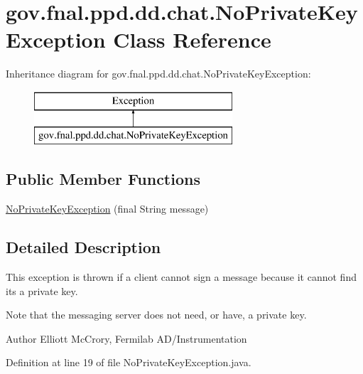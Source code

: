 \hypertarget{classgov_1_1fnal_1_1ppd_1_1dd_1_1chat_1_1NoPrivateKeyException}{\section{gov.\-fnal.\-ppd.\-dd.\-chat.\-No\-Private\-Key\-Exception Class Reference}
\label{classgov_1_1fnal_1_1ppd_1_1dd_1_1chat_1_1NoPrivateKeyException}
}
Inheritance diagram for gov.\-fnal.\-ppd.\-dd.\-chat.\-No\-Private\-Key\-Exception\-:\begin{figure}[H]
\begin{center}
\leavevmode
\includegraphics[height=2.000000cm]{classgov_1_1fnal_1_1ppd_1_1dd_1_1chat_1_1NoPrivateKeyException}
\end{center}
\end{figure}
\subsection*{Public Member Functions}
\begin{DoxyCompactItemize}
\item 
\hyperlink{classgov_1_1fnal_1_1ppd_1_1dd_1_1chat_1_1NoPrivateKeyException_a3ffa7c8308049379103676a72dfd6416}{No\-Private\-Key\-Exception} (final String message)
\end{DoxyCompactItemize}


\subsection{Detailed Description}
This exception is thrown if a client cannot sign a message because it cannot find its a private key. 

Note that the messaging server does not need, or have, a private key. 

\begin{DoxyAuthor}{Author}
Elliott Mc\-Crory, Fermilab A\-D/\-Instrumentation 
\end{DoxyAuthor}


Definition at line 19 of file No\-Private\-Key\-Exception.\-java.




